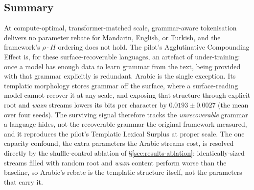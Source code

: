 \subsection{Summary}
\label{sec:results-summary}

At compute-optimal, transformer-matched scale, grammar-aware tokenisation delivers no parameter rebate for Mandarin, English, or Turkish, and the framework's $\rho \cdot H$ ordering does not hold. The pilot's Agglutinative Compounding Effect is, for these surface-recoverable languages, an artefact of under-training: once a model has enough data to learn grammar from the text, being provided with that grammar explicitly is redundant. Arabic is the single exception. Its templatic morphology stores grammar off the surface, where a surface-reading model cannot recover it at any scale, and exposing that structure through explicit root and \emph{wazn} streams lowers its bits per character by $0.0193 \pm 0.0027$ (the mean over four seeds). The surviving signal therefore tracks the \emph{unrecoverable} grammar a language hides, not the recoverable grammar the original framework measured, and it reproduces the pilot's Templatic Lexical Surplus at proper scale. The one capacity confound, the extra parameters the Arabic streams cost, is resolved directly by the shuffle-control ablation of \S\ref{sec:results-ablation}: identically-sized streams filled with random root and \emph{wazn} content perform worse than the baseline, so Arabic's rebate is the templatic structure itself, not the parameters that carry it.
